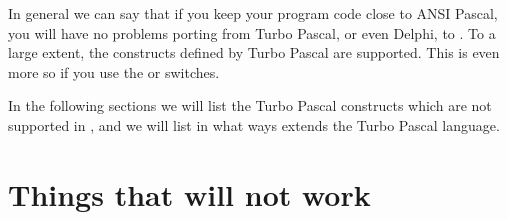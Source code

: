\documentclass{book}
\begin{document}
In general we can say that if you keep your program code close to ANSI
Pascal, you will have no problems porting from Turbo Pascal, or even Delphi, to
\fpc. To a large extent, the constructs defined by Turbo Pascal are
supported. This is even more so if you use the  or 
switches.

In the following sections we will list the Turbo Pascal constructs which are
not supported in \fpc, and we will list in what ways \fpc extends the Turbo
Pascal language.


\section{Things that will not work}
\end{document}
